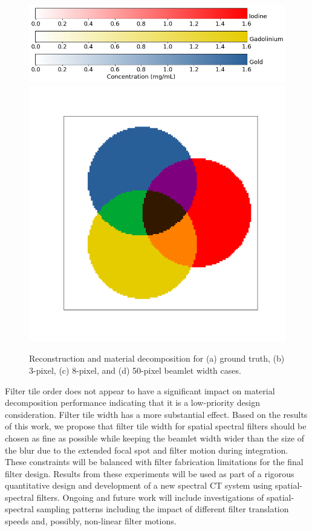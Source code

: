\documentclass[12pt]{spieman}  %
\begin{document}
\begin{spacing}{1}
\begin{figure}
\begin{subfigure}[t]{.35\textwidth}
      \caption{}
      \label{fig:xi_50}
    \end{subfigure}%
    \vspace{4mm}
    \includegraphics[clip, trim={0 0 0 0}, scale = 0.3, align=c]{figures/RYB_colorbar.png}
     \includegraphics[clip, trim={4.5cm 3.3cm 2.5cm 3.3cm}, scale = 0.16, align=c]{figures/colorMixingSubtractive.png}
    \caption{Reconstruction and material decomposition for (a) ground truth, (b) 3-pixel, (c) 8-pixel, and (d) 50-pixel beamlet width cases.}
    \label{fig:RYB}
\end{figure}

Filter tile order does not appear to have a significant impact on material decomposition performance indicating that it is a low-priority design consideration. Filter tile width has a more substantial effect.  Based on the results of this work, we propose that filter tile width for spatial spectral filters should be chosen as fine as possible while keeping the beamlet width wider than the size of the blur due to the extended focal spot and filter motion during integration. These constraints will be balanced with filter fabrication limitations for the final filter design. Results from these experiments will be used as part of a rigorous quantitative design and development of a new spectral CT system using spatial-spectral filters. Ongoing and future work will include investigations of spatial-spectral sampling patterns including the impact of different filter translation speeds and, possibly, non-linear filter motions.  


\end{spacing}
\end{document}
